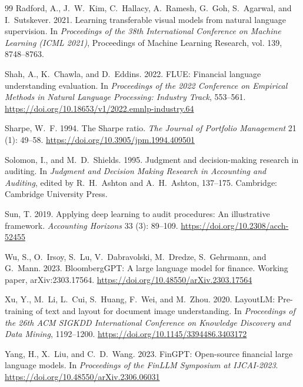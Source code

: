 \documentclass[12pt,letterpaper]{article}
\begin{document}
\begin{thebibliography}{99}
Radford, A., J.~W.~Kim, C.~Hallacy, A.~Ramesh, G.~Goh,
  S.~Agarwal, and I.~Sutskever. 2021.
\newblock Learning transferable visual models from natural language
  supervision.
\newblock In \textit{Proceedings of the 38th International Conference
  on Machine Learning (ICML 2021)}, Proceedings of Machine Learning
  Research, vol. 139, 8748--8763.

Shah, A., K.~Chawla, and D.~Eddins. 2022.
\newblock FLUE: Financial language understanding evaluation.
\newblock In \textit{Proceedings of the 2022 Conference on Empirical
  Methods in Natural Language Processing: Industry Track}, 553--561.
\newblock \url{https://doi.org/10.18653/v1/2022.emnlp-industry.64}

Sharpe, W.~F. 1994.
\newblock The Sharpe ratio.
\newblock \textit{The Journal of Portfolio Management} 21 (1): 49--58.
\newblock \url{https://doi.org/10.3905/jpm.1994.409501}

Solomon, I., and M.~D.~Shields. 1995.
\newblock Judgment and decision-making research in auditing.
\newblock In \textit{Judgment and Decision Making Research in
  Accounting and Auditing}, edited by R.~H.~Ashton and
  A.~H.~Ashton, 137--175.
\newblock Cambridge: Cambridge University Press.

Sun, T. 2019.
\newblock Applying deep learning to audit procedures: An illustrative
  framework.
\newblock \textit{Accounting Horizons} 33 (3): 89--109.
\newblock \url{https://doi.org/10.2308/acch-52455}

Wu, S., O.~Irsoy, S.~Lu, V.~Dabravolski, M.~Dredze,
  S.~Gehrmann, and G.~Mann. 2023.
\newblock BloombergGPT: A large language model for finance.
\newblock Working paper, arXiv:2303.17564.
\newblock \url{https://doi.org/10.48550/arXiv.2303.17564}

Xu, Y., M.~Li, L.~Cui, S.~Huang, F.~Wei, and M.~Zhou. 2020.
\newblock LayoutLM: Pre-training of text and layout for document image
  understanding.
\newblock In \textit{Proceedings of the 26th ACM SIGKDD International
  Conference on Knowledge Discovery and Data Mining}, 1192--1200.
\newblock \url{https://doi.org/10.1145/3394486.3403172}

Yang, H., X.~Liu, and C.~D.~Wang. 2023.
\newblock FinGPT: Open-source financial large language models.
\newblock In \textit{Proceedings of the FinLLM Symposium at
  IJCAI-2023}.
\newblock \url{https://doi.org/10.48550/arXiv.2306.06031}


\end{thebibliography}
\end{document}
